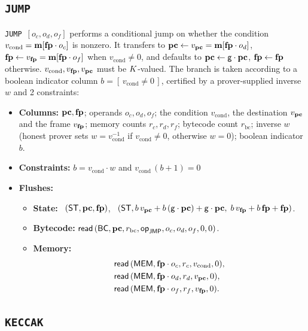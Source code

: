 \subsection{\texttt{JUMP}}\label{sec:tab-jump}

\texttt{JUMP}\ $[o_c,o_d,o_f]$ performs a conditional jump on whether the condition $v_{\mathrm{cond}}=\mathbf{m}[\mathbf{fp}\cdot o_c]$ is nonzero. It transfers to $\mathbf{pc}\gets v_{\mathbf{pc}} = \mathbf{m}[\mathbf{fp}\cdot o_d]$, $\mathbf{fp}\gets v_{\mathbf{fp}} = \mathbf{m}[\mathbf{fp}\cdot o_f]$ when $v_{\mathrm{cond}}\neq0$, and defaults to $\mathbf{pc}\gets\mathsf{g}\cdot\mathbf{pc}$, $\mathbf{fp}\gets\mathbf{fp}$ otherwise. $v_{\mathrm{cond}}, v_{\mathbf{fp}}, v_{\mathbf{pc}}$ must be $K$-valued. The branch is taken according to a boolean indicator column $b=[\,v_{\mathrm{cond}}\neq0\,]$, certified by a prover-supplied inverse $w$ and 2 constraints:

\begin{itemize}
\item \textbf{Columns:} $\mathbf{pc},\mathbf{fp}$; operands $o_c,o_d,o_f$; the condition $v_{\mathrm{cond}}$, the destination $v_{\mathbf{pc}}$ and the frame $v_{\mathbf{fp}}$; memory counts $r_c,r_d,r_f$; bytecode count $r_{\mathrm{bc}}$; inverse $w$ (honest prover sets $w = v_{\mathrm{cond}}^{-1}$ if $v_{\mathrm{cond}}\neq0$, otherwise $w=0$); boolean indicator $b$.
\item \textbf{Constraints:}  $b=v_{\mathrm{cond}}\cdot w$ and $v_{\mathrm{cond}}\,(b+1)=0$
\item \textbf{Flushes:}
  \begin{itemize}
  \item \textbf{State:} \pull\ $( \mathsf{ST},\mathbf{pc},\mathbf{fp} )$, \push\ $( \mathsf{ST},b\,v_{\mathbf{pc}}+b\,(\mathsf{g}\cdot\mathbf{pc})+\mathsf{g}\cdot\mathbf{pc},\;b\,v_{\mathbf{fp}}+b\,\mathbf{fp}+\mathbf{fp} )$.
  \item \textbf{Bytecode:} $\mathsf{read}\,( \mathsf{BC},\mathbf{pc},r_{\mathrm{bc}},\mathsf{op}_{\mathsf{JMP}},o_c,o_d,o_f,0,0 )$.
  \item \textbf{Memory:}
    \begin{align*}
      &\mathsf{read}\,( \mathsf{MEM},\mathbf{fp}\cdot o_c,r_c,v_{\mathrm{cond}},0 ),\\
      &\mathsf{read}\,( \mathsf{MEM},\mathbf{fp}\cdot o_d,r_d,v_{\mathbf{pc}},0 ),\\
      &\mathsf{read}\,( \mathsf{MEM},\mathbf{fp}\cdot o_f,r_f,v_{\mathbf{fp}},0 ).
    \end{align*}
  \end{itemize}
\end{itemize}

\subsection{\texttt{KECCAK}}\label{sec:tab-keccak}

